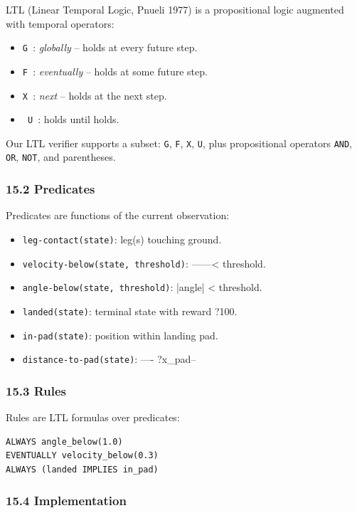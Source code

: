 \documentclass[11pt]{article}
\begin{document}
LTL (Linear Temporal Logic, Pnueli 1977) is a propositional logic augmented with
temporal operators:

\begin{itemize}
  \item \texttt{G }: \textit{globally} -- holds at every future step.
  \item \texttt{F }: \textit{eventually} -- holds at some future step.
  \item \texttt{X }: \textit{next} -- holds at the next step.
  \item \texttt{ U }:  holds until  holds.
\end{itemize}


Our LTL verifier supports a subset: \texttt{G}, \texttt{F}, \texttt{X}, \texttt{U}, plus propositional
operators \texttt{AND}, \texttt{OR}, \texttt{NOT}, and parentheses.

\subsubsection{15.2 Predicates}

Predicates are functions of the current observation:

\begin{itemize}
  \item \texttt{leg-contact(state)}: leg(s) touching ground.
  \item \texttt{velocity-below(state, threshold)}: ------< threshold.
  \item \texttt{angle-below(state, threshold)}: |angle| < threshold.
  \item \texttt{landed(state)}: terminal state with reward ?100.
  \item \texttt{in-pad(state)}: position within landing pad.
  \item \texttt{distance-to-pad(state)}: ---- ?x\_pad--
\end{itemize}


\subsubsection{15.3 Rules}

Rules are LTL formulas over predicates:

\begin{verbatim}
ALWAYS angle_below(1.0)
EVENTUALLY velocity_below(0.3)
ALWAYS (landed IMPLIES in_pad)
\end{verbatim}

\subsubsection{15.4 Implementation}
\end{document}
